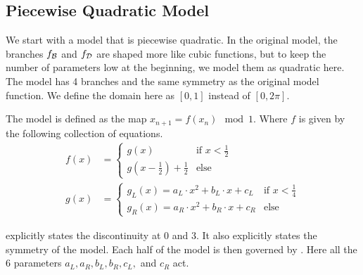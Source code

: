 \subsection{Piecewise Quadratic Model}
\label{sec:setup.quad}

We start with a model that is piecewise quadratic.
In the original model, the branches $f_{\mathcal{B}}$ and $f_{\mathcal{D}}$ are shaped more like cubic functions, but to keep the number of parameters low at the beginning, we model them as quadratic here.
The model has 4 branches and the same symmetry as the original model function.
We define the domain here as $[0, 1]$ instead of $[0, 2\pi]$.

The model is defined as the map $x_{n+1} = f(x_n) \mod 1$.
Where $f$ is given by the following collection of equations.
\begin{align}
	f(x) & = \begin{cases}
		         g(x)                             & \text{if } x < \frac{1}{2} \\
		         g(x - \frac{1}{2}) + \frac{1}{2} & \text{else}
	         \end{cases} \label{equ:quad.full.f}           \\
	g(x) & = \begin{cases}
		         g_L(x) = a_L \cdot x^2 + b_L \cdot x + c_L & \text{if } x < \frac{1}{4} \\
		         g_R(x) = a_R \cdot x^2 + b_R \cdot x + c_R & \text{else}
	         \end{cases} \label{equ:quad.full.g}
\end{align}

 explicitly states the discontinuity at $0$ and $3$.
It also explicitly states the symmetry of the model.
Each half of the model is then governed by .
Here all the 6 parameters $a_L, a_R, b_L, b_R, c_L,$ and $c_R$ act.
